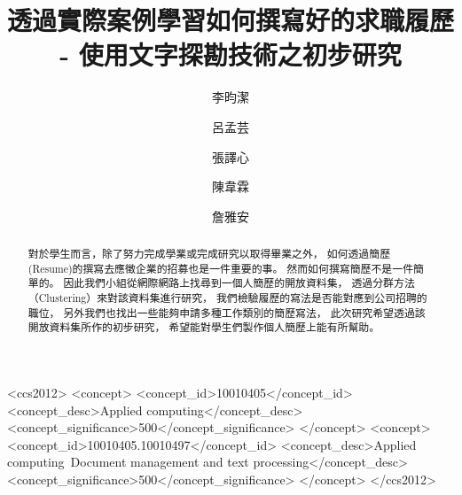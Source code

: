\documentclass[acmsmall]{acmart}
\begin{document}
\title{透過實際案例學習如何撰寫好的求職履歷 - 使用文字探勘技術之初步研究}


\author{李昀潔}
\author{呂孟芸}
\author{張譯心}
\author{陳韋霖}
\author{詹雅安}


\begin{abstract}
    對於學生而言，除了努力完成學業或完成研究以取得畢業之外，
    如何透過簡歷(Resume)的撰寫去應徵企業的招募也是一件重要的事。
    然而如何撰寫簡歷不是一件簡單的。
    因此我們小組從網際網路上找尋到一個人簡歷的開放資料集，
    透過分群方法（Clustering）來對該資料集進行研究，
    我們檢驗履歷的寫法是否能對應到公司招聘的職位，
    另外我們也找出一些能夠申請多種工作類別的簡歷寫法，
    此次研究希望透過該開放資料集所作的初步研究，
    希望能對學生們製作個人簡歷上能有所幫助。
\end{abstract}


\begin{CCSXML}
<ccs2012>
   <concept>
       <concept_id>10010405</concept_id>
       <concept_desc>Applied computing</concept_desc>
       <concept_significance>500</concept_significance>
       </concept>
   <concept>
       <concept_id>10010405.10010497</concept_id>
       <concept_desc>Applied computing~Document management and text processing</concept_desc>
       <concept_significance>500</concept_significance>
       </concept>
 </ccs2012>
\end{CCSXML}
\end{document}
